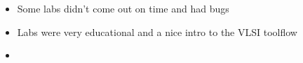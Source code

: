 
\begin{itemize}
    \item Some labs didn't come out on time and had bugs
    \item Labs were very educational and a nice intro to the VLSI toolflow
    \item 
\end{itemize}

